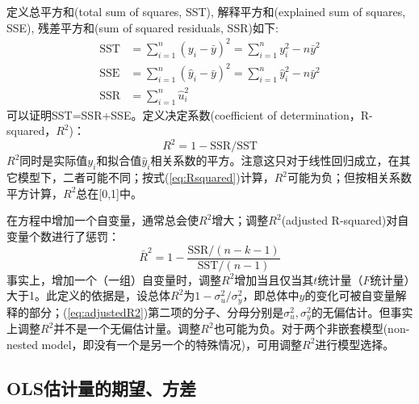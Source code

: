 \par 定义总平方和(total sum of squares, SST), 解释平方和(explained sum of squares, SSE), 残差平方和(sum of squared residuals, SSR)如下:
\begin{align}
    \text{SST}&=\sum_{i=1}^n (y_i-\bar{y})^2=\sum_{i=1}^n y_i^2-n\bar{y}^2\\
    \text{SSE}&=\sum_{i=1}^n (\hat{y}_i-\bar{y})^2=\sum_{i=1}^n \hat{y}_i^2-n\bar{y}^2\\
    \text{SSR}&=\sum_{i=1}^n \hat{u}_i^2
\end{align}
可以证明SST=SSR+SSE。定义决定系数(coefficient of determination，R-squared，$R^2$)：
\begin{equation}
    R^2=1-\text{SSR}/\text{SST}\label{eq:Rsquared}
\end{equation}
$R^2$同时是实际值$y_i$和拟合值$\hat{y}_i$相关系数的平方。注意这只对于线性回归成立，在其它模型下，二者可能不同；按式(\ref{eq:Rsquared})计算，$R^2$可能为负；但按相关系数平方计算，$R^2$总在[0,1]中。

\par 在方程中增加一个自变量，通常总会使$R^2$增大；调整$R^2$(adjusted R-squared)对自变量个数进行了惩罚：
\begin{equation}
    \bar{R}^2=1-\frac{\text{SSR}/(n-k-1)}{\text{SST}/(n-1)}\label{eq:adjustedR2}
\end{equation}
事实上，增加一个（一组）自变量时，调整$R^2$增加当且仅当其$t$统计量（$F$统计量）大于1。此定义的依据是，设总体$R^2$为$1-\sigma_u^2/\sigma_y^2$，即总体中$y$的变化可被自变量解释的部分；(\ref{eq:adjustedR2})第二项的分子、分母分别是$\sigma_u^2,\sigma_y^2$的无偏估计。但事实上调整$R^2$并不是一个无偏估计量。调整$R^2$也可能为负。对于两个非嵌套模型(non-nested model，即没有一个是另一个的特殊情况)，可用调整$R^2$进行模型选择。

\subsection{OLS估计量的期望、方差}

